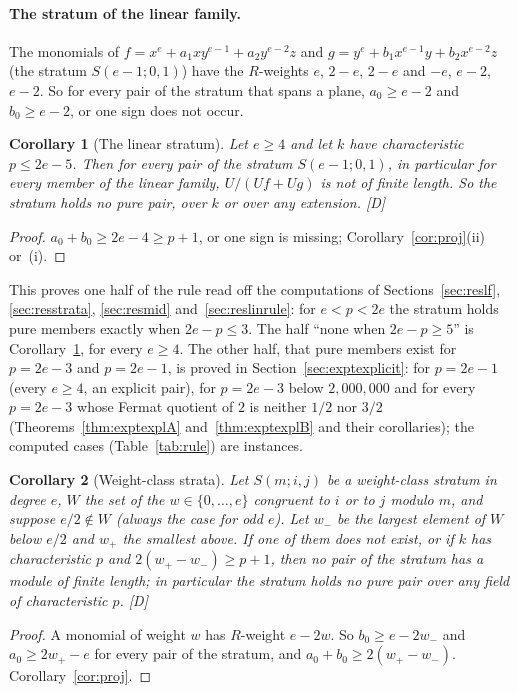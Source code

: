 \documentclass[11pt]{article}
\newtheorem{corollary}{Corollary}
\theoremstyle{definition}
\theoremstyle{remark}
\begin{document}
\paragraph{The stratum of the linear family.} The monomials of $f=x^e+a_1xy^{e-1}+a_2y^{e-2}z$ and $g=y^e+b_1x^{e-1}y+b_2x^{e-2}z$ (the stratum $S(e-1;0,1)$) have the $R$-weights $e$, $2-e$, $2-e$ and $-e$, $e-2$, $e-2$. So for every pair of the stratum that spans a plane, $a_0\ge e-2$ and $b_0\ge e-2$, or one sign does not occur.

\begin{corollary}[The linear stratum]\label{cor:linstratum}
Let $e\ge4$ and let $k$ have characteristic $p\le2e-5$. Then for every pair of the stratum $S(e-1;0,1)$, in particular for every member of the linear family, $U/(Uf+Ug)$ is not of finite length. So the stratum holds no pure pair, over $k$ or over any extension. [D]
\end{corollary}
\begin{proof}
$a_0+b_0\ge2e-4\ge p+1$, or one sign is missing; Corollary~\ref{cor:proj}(ii) or~(i).
\end{proof}

This proves one half of the rule read off the computations of Sections~\ref{sec:reslf}, \ref{sec:resstrata}, \ref{sec:resmid} and~\ref{sec:reslinrule}: for $e<p<2e$ the stratum holds pure members exactly when $2e-p\le3$. The half ``none when $2e-p\ge5$'' is Corollary~\ref{cor:linstratum}, for every $e\ge4$. The other half, that pure members exist for $p=2e-3$ and $p=2e-1$, is proved in Section~\ref{sec:exptexplicit}: for $p=2e-1$ (every $e\ge4$, an explicit pair), for $p=2e-3$ below $2{,}000{,}000$ and for every $p=2e-3$ whose Fermat quotient of $2$ is neither $1/2$ nor $3/2$ (Theorems~\ref{thm:exptexplA} and~\ref{thm:exptexplB} and their corollaries); the computed cases (Table~\ref{tab:rule}) are instances.

\begin{corollary}[Weight-class strata]\label{cor:wzstrata}
Let $S(m;i,j)$ be a weight-class stratum in degree $e$, $W$ the set of the $w\in\{0,\dots,e\}$ congruent to $i$ or to $j$ modulo $m$, and suppose $e/2\notin W$ (always the case for odd $e$). Let $w_-$ be the largest element of $W$ below $e/2$ and $w_+$ the smallest above. If one of them does not exist, or if $k$ has characteristic $p$ and $2(w_+-w_-)\ge p+1$, then no pair of the stratum has a module of finite length; in particular the stratum holds no pure pair over any field of characteristic $p$. [D]
\end{corollary}
\begin{proof}
A monomial of weight $w$ has $R$-weight $e-2w$. So $b_0\ge e-2w_-$ and $a_0\ge2w_+-e$ for every pair of the stratum, and $a_0+b_0\ge2(w_+-w_-)$. Corollary~\ref{cor:proj}.
\end{proof}
\end{document}
